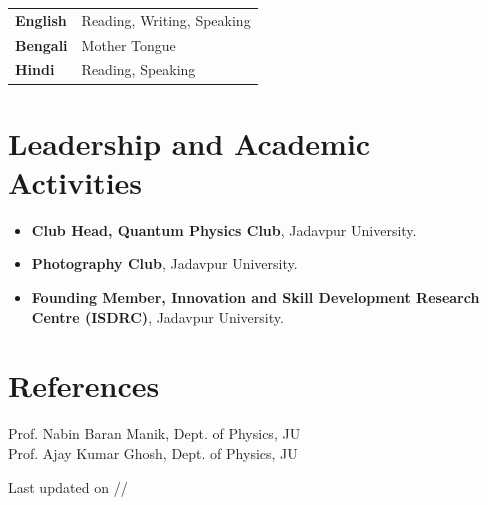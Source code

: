 \documentclass[11pt,a4paper]{article}
\begin{document}
\begin{tabularx}{\textwidth}{@{}>{\bfseries}p{3.0cm}X@{}}

English & Reading, Writing, Speaking \\[2pt]

Bengali & Mother Tongue \\[2pt]

Hindi & Reading, Speaking \\

\end{tabularx}



\section{Leadership and Academic Activities}

\begin{itemize}

    \item \textbf{Club Head, Quantum Physics Club},
    Jadavpur University.

    \item \textbf{Photography Club},
    Jadavpur University.

    \item \textbf{Founding Member, Innovation and Skill Development
    Research Centre (ISDRC)}, Jadavpur University.

\end{itemize}



\section{References}
Prof. Nabin Baran Manik, Dept. of Physics, JU\\
Prof. Ajay Kumar Ghosh, Dept. of Physics, JU\\


\vfill

\begin{center}
\small
Last updated on \number\day/\number\month/\number\year
\end{center}
\end{document}
